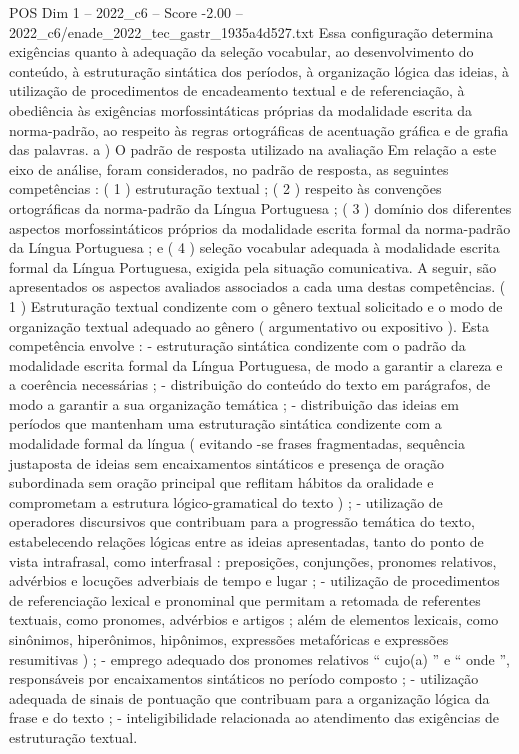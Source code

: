 \begin{textsample}{POS Dim 1 – 2022\_c6 – Score -2.00 – 2022\_c6/enade\_2022\_tec\_gastr\_1935a4d527.txt}
Essa configuração determina exigências quanto à adequação da seleção vocabular, ao desenvolvimento do conteúdo, à estruturação sintática dos períodos, à organização lógica das ideias, à utilização de procedimentos de encadeamento textual e de referenciação, à obediência às exigências morfossintáticas próprias da modalidade escrita da norma-padrão, ao respeito às regras ortográficas de acentuação gráfica e de grafia das palavras. a ) O padrão de resposta utilizado na avaliação Em relação a este eixo de análise, foram considerados, no padrão de resposta, as seguintes competências : ( 1 ) estruturação textual ; ( 2 ) respeito às convenções ortográficas da norma-padrão da Língua Portuguesa ; ( 3 ) domínio dos diferentes aspectos morfossintáticos próprios da modalidade escrita formal da norma-padrão da Língua Portuguesa ; e ( 4 ) seleção vocabular adequada à modalidade escrita formal da Língua Portuguesa, exigida pela situação comunicativa.
A seguir, são apresentados os aspectos avaliados associados a cada uma destas competências. ( 1 ) Estruturação textual condizente com o gênero textual solicitado e o modo de organização textual adequado ao gênero ( argumentativo ou expositivo ).
Esta competência envolve : - estruturação sintática condizente com o padrão da modalidade escrita formal da Língua Portuguesa, de modo a garantir a clareza e a coerência necessárias ; - distribuição do conteúdo do texto em parágrafos, de modo a garantir a sua organização temática ; - distribuição das ideias em períodos que mantenham uma estruturação sintática condizente com a modalidade formal da língua ( evitando -se frases fragmentadas, sequência justaposta de ideias sem encaixamentos sintáticos e presença de oração subordinada sem oração principal que reflitam hábitos da oralidade e comprometam a estrutura lógico-gramatical do texto ) ; - utilização de operadores discursivos que contribuam para a progressão temática do texto, estabelecendo relações lógicas entre as ideias apresentadas, tanto do ponto de vista intrafrasal, como interfrasal : preposições, conjunções, pronomes relativos, advérbios e locuções adverbiais de tempo e lugar ; - utilização de procedimentos de referenciação lexical e pronominal que permitam a retomada de referentes textuais, como pronomes, advérbios e artigos ; além de elementos lexicais, como sinônimos, hiperônimos, hipônimos, expressões metafóricas e expressões resumitivas ) ; - emprego adequado dos pronomes relativos “ cujo(a) ” e “ onde ”, responsáveis por encaixamentos sintáticos no período composto ; - utilização adequada de sinais de pontuação que contribuam para a organização lógica da frase e do texto ; - inteligibilidade relacionada ao atendimento das exigências de estruturação textual.

\end{textsample}
